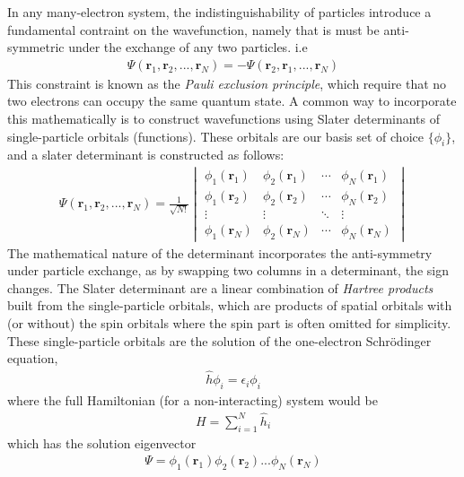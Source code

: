 \documentclass{subfiles}
\begin{document}
In any many-electron system, the indistinguishability of particles introduce a fundamental contraint on the wavefunction, namely that is must be anti-symmetric under the exchange of any two particles. i.e 
\begin{align*}
    \Psi(\mathbf{r}_1, \mathbf{r}_2, ..., \mathbf{r}_N) = -\Psi(\mathbf{r}_2, \mathbf{r}_1, ..., \mathbf{r}_N)
\end{align*}
This constraint is known as the \emph{Pauli exclusion principle}, which require that no two electrons can occupy the same quantum state. A common way to incorporate this mathematically is to construct wavefunctions using Slater determinants of single-particle orbitals (functions). These orbitals are our basis set of choice $\{\phi_i\}$, and a slater determinant is constructed as follows:
\begin{align*}
    \Psi(\mathbf{r}_1, \mathbf{r}_2, ..., \mathbf{r}_N) = \frac{1}{\sqrt{N!}}\begin{vmatrix}
        \phi_1(\mathbf{r}_1) & \phi_2(\mathbf{r}_1) & \cdots & \phi_N(\mathbf{r}_1)\\
        \phi_1(\mathbf{r}_2) & \phi_2(\mathbf{r}_2) & \cdots & \phi_N(\mathbf{r}_2)\\
        \vdots & \vdots & \ddots & \vdots\\
        \phi_1(\mathbf{r}_N) & \phi_2(\mathbf{r}_N) & \cdots & \phi_N(\mathbf{r}_N)
    \end{vmatrix}
\end{align*}
The mathematical nature of the determinant incorporates the anti-symmetry under particle exchange, as by swapping two columns in a determinant, the sign changes. The Slater determinant are a linear combination of \emph{Hartree products} built from the single-particle orbitals, which are products of spatial orbitals with (or without) the spin orbitals where the spin part is often omitted for simplicity. These single-particle orbitals are the solution of the one-electron Schrödinger equation, 
\begin{align*}
    \hat{h}\phi_i = \epsilon_i\phi_i
\end{align*}
where the full Hamiltonian (for a non-interacting) system would be 
\begin{align*}
    H = \sum_{i=1}^N \hat{h}_i
\end{align*}
which has the solution eigenvector
\begin{align}
    \Psi = \phi_1(\mathbf{r}_1)\phi_2(\mathbf{r}_2)...\phi_N(\mathbf{r}_N)\label{eq:hartree_product}
\end{align}
\end{document}
